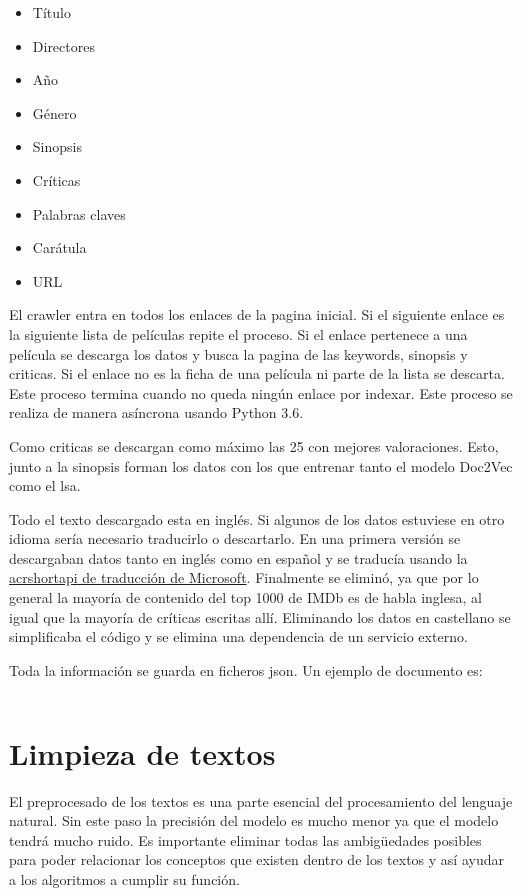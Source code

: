 \documentclass[withindex, glossary]{cam-thesis}
\begin{document}
\setlength{\columnseprule}{0pt}
\begin{multicols}{2}
    \begin{itemize}
        \item Título
        \item Directores
        \item Año
        \item Género
        \item Sinopsis
        \item Críticas
        \item Palabras claves
        \item Carátula
        \item URL
    \end{itemize}
\end{multicols}

El crawler entra en todos los enlaces de la pagina inicial. Si el siguiente enlace es la siguiente lista de películas repite el proceso. Si el enlace pertenece a una película se descarga los datos y busca la pagina de las keywords, sinopsis y criticas. Si el enlace no es la ficha de una película ni parte de la lista se descarta. Este proceso termina cuando no queda ningún enlace por indexar. Este proceso se realiza de manera asíncrona usando Python 3.6.

Como criticas se descargan como máximo las 25 con mejores valoraciones. Esto, junto a la sinopsis forman los datos con los que entrenar tanto el modelo Doc2Vec como el \acrshort{lsa}.

Todo el texto descargado esta en inglés. Si algunos de los datos estuviese en otro idioma sería necesario traducirlo o descartarlo. En una primera versión se descargaban datos tanto en inglés como en español y se traducía usando la \href{https://www.microsoft.com/en-us/translator/translatorapi.aspx}{acrshort{api} de traducción de Microsoft}. Finalmente se eliminó, ya que por lo general la mayoría de contenido del top 1000 de IMDb\cite{imdb} es de habla inglesa, al igual que la mayoría de críticas escritas allí. Eliminando los datos en castellano se simplificaba el código y se elimina una dependencia de un servicio externo.

Toda la información se guarda en ficheros \acrshort{json}. Un ejemplo de documento es:

\inputminted[xleftmargin=21pt, breaklines=true, tabsize=2]{json}{figures/example.json}

\chapter{Limpieza de textos}\label{chap:clean}
El preprocesado de los textos es una parte esencial del procesamiento del lenguaje natural. Sin este paso la precisión del modelo es mucho menor ya que el modelo tendrá mucho ruido. Es importante eliminar todas las ambigüedades posibles para poder relacionar los conceptos que existen dentro de los textos y así ayudar a los algoritmos a cumplir su función.
\end{document}
